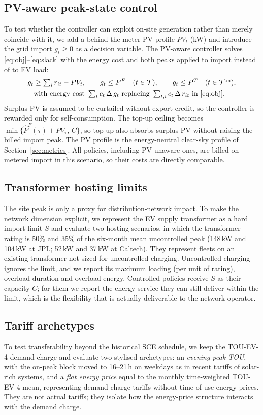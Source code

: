 \subsection{PV-aware peak-state control}\label{sec:pvaware}
To test whether the controller can exploit on-site generation rather than merely coincide with it, we add a behind-the-meter PV profile $PV_t$ (kW) and introduce the grid import $g_t\ge 0$ as a decision variable. The PV-aware controller solves \eqref{eq:obj}--\eqref{eq:slack} with the energy cost and both peaks applied to import instead of to EV load:
\begin{align}
g_t &\ge \textstyle\sum_i r_{it}-PV_t, \qquad g_t\le P^F\quad (t\in\mathcal T), \qquad g_t\le P^T\quad (t\in\mathcal T^{\text{on}}), \label{eq:pvaware}\\
&\text{with energy cost } \textstyle\sum_t c_t\,\Delta\, g_t \text{ replacing } \sum_{t,i} c_t\,\Delta\, r_{it} \text{ in \eqref{eq:obj}}. \nonumber
\end{align}
Surplus PV is assumed to be curtailed without export credit, so the controller is rewarded only for self-consumption. The top-up ceiling becomes $\min\{\hat P^F(\tau)+PV_\tau,\,C\}$, so top-up also absorbs surplus PV without raising the billed import peak. The PV profile is the energy-neutral clear-sky profile of Section~\ref{sec:metrics}. All policies, including PV-unaware ones, are billed on metered import in this scenario, so their costs are directly comparable.

\subsection{Transformer hosting limits}\label{sec:xfmr}
The site peak is only a proxy for distribution-network impact. To make the network dimension explicit, we represent the EV supply transformer as a hard import limit $\bar S$ and evaluate two hosting scenarios, in which the transformer rating is 50\% and 35\% of the six-month mean uncontrolled peak (148\,kW and 104\,kW at JPL; 52\,kW and 37\,kW at Caltech). They represent fleets on an existing transformer not sized for uncontrolled charging. Uncontrolled charging ignores the limit, and we report its maximum loading (per unit of rating), overload duration and overload energy. Controlled policies receive $\bar S$ as their capacity $C$; for them we report the energy service they can still deliver within the limit, which is the flexibility that is actually deliverable to the network operator.

\subsection{Tariff archetypes}\label{sec:archetypes}
To test transferability beyond the historical SCE schedule, we keep the TOU-EV-4 demand charge and evaluate two stylised archetypes: an \emph{evening-peak TOU}, with the on-peak block moved to 16--21\,h on weekdays as in recent tariffs of solar-rich systems, and a \emph{flat energy price} equal to the monthly time-weighted TOU-EV-4 mean, representing demand-charge tariffs without time-of-use energy prices. They are not actual tariffs; they isolate how the energy-price structure interacts with the demand charge.

